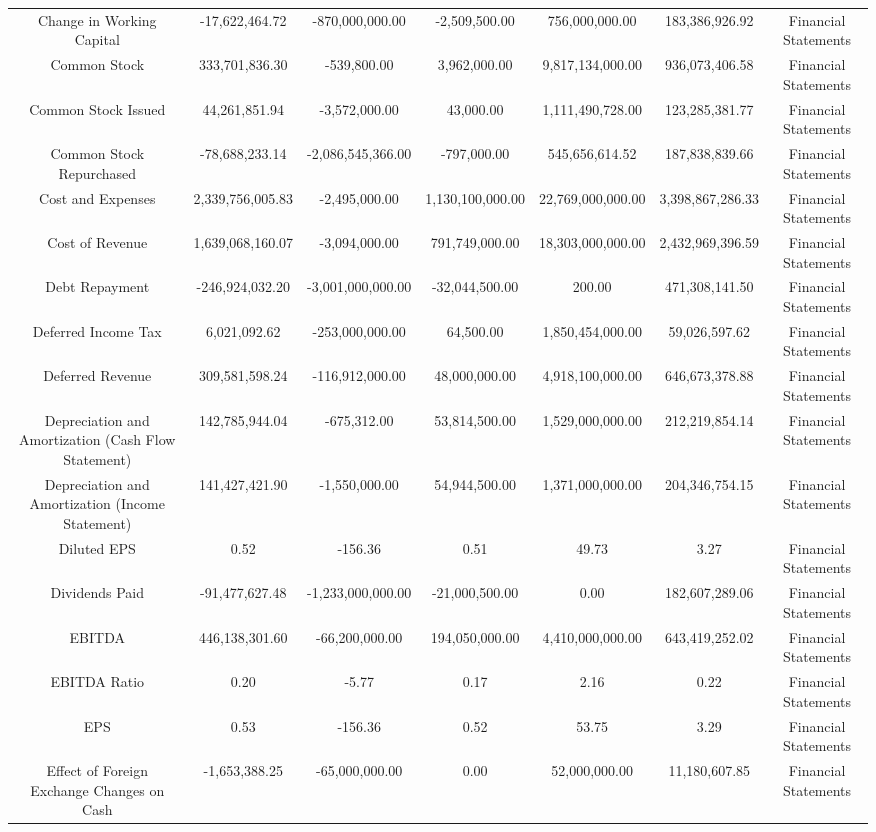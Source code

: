 \begin{longtable}{ccccccc}
Change in Working Capital & -17,622,464.72 & -870,000,000.00 & -2,509,500.00 & 756,000,000.00 & 183,386,926.92 & Financial Statements \\
Common Stock & 333,701,836.30 & -539,800.00 & 3,962,000.00 & 9,817,134,000.00 & 936,073,406.58 & Financial Statements \\
Common Stock Issued & 44,261,851.94 & -3,572,000.00 & 43,000.00 & 1,111,490,728.00 & 123,285,381.77 & Financial Statements \\
Common Stock Repurchased & -78,688,233.14 & -2,086,545,366.00 & -797,000.00 & 545,656,614.52 & 187,838,839.66 & Financial Statements \\
Cost and Expenses & 2,339,756,005.83 & -2,495,000.00 & 1,130,100,000.00 & 22,769,000,000.00 & 3,398,867,286.33 & Financial Statements \\
Cost of Revenue & 1,639,068,160.07 & -3,094,000.00 & 791,749,000.00 & 18,303,000,000.00 & 2,432,969,396.59 & Financial Statements \\
Debt Repayment & -246,924,032.20 & -3,001,000,000.00 & -32,044,500.00 & 200.00 & 471,308,141.50 & Financial Statements \\
Deferred Income Tax & 6,021,092.62 & -253,000,000.00 & 64,500.00 & 1,850,454,000.00 & 59,026,597.62 & Financial Statements \\
Deferred Revenue & 309,581,598.24 & -116,912,000.00 & 48,000,000.00 & 4,918,100,000.00 & 646,673,378.88 & Financial Statements \\
Depreciation and Amortization (Cash Flow Statement) & 142,785,944.04 & -675,312.00 & 53,814,500.00 & 1,529,000,000.00 & 212,219,854.14 & Financial Statements \\
Depreciation and Amortization (Income Statement) & 141,427,421.90 & -1,550,000.00 & 54,944,500.00 & 1,371,000,000.00 & 204,346,754.15 & Financial Statements \\
Diluted EPS & 0.52 & -156.36 & 0.51 & 49.73 & 3.27 & Financial Statements \\
Dividends Paid & -91,477,627.48 & -1,233,000,000.00 & -21,000,500.00 & 0.00 & 182,607,289.06 & Financial Statements \\
EBITDA & 446,138,301.60 & -66,200,000.00 & 194,050,000.00 & 4,410,000,000.00 & 643,419,252.02 & Financial Statements \\
EBITDA Ratio & 0.20 & -5.77 & 0.17 & 2.16 & 0.22 & Financial Statements \\
EPS & 0.53 & -156.36 & 0.52 & 53.75 & 3.29 & Financial Statements \\
Effect of Foreign Exchange Changes on Cash & -1,653,388.25 & -65,000,000.00 & 0.00 & 52,000,000.00 & 11,180,607.85 & Financial Statements \\

\end{longtable}

